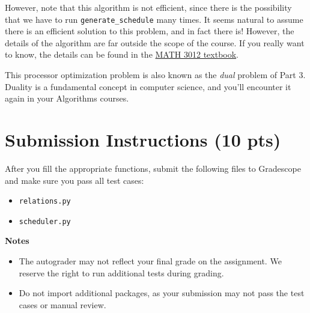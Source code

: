 \documentclass{article}
\begin{document}
    \vspace{3mm}
    However, note that this algorithm is not efficient, since there is the possibility that we have to run \lstinline{generate_schedule} many times. It seems natural to assume there is an efficient solution to this problem, and in fact there is! However, the details of the algorithm are far outside the scope of the course. If you really want to know, the details can be found in the \href{https://www.appliedcombinatorics.org/book/s_flowapplications_chain-partition.html}{MATH 3012 textbook}.
    
    
    \vspace{3mm} This processor optimization problem is also known as the \textit{dual} problem of Part 3. Duality is a fundamental concept in computer science, and you'll encounter it again in your Algorithms courses.



    



\section*{Submission Instructions (10 pts)}
    After you fill the appropriate functions, submit the following files to Gradescope and make sure you pass all test cases:
    \begin{itemize}
        \item \lstinline{relations.py}
        \item \lstinline{scheduler.py}
    \end{itemize}

    \vspace{3mm}
    \textbf{Notes}

    \begin{itemize}
        \item The autograder may not reflect your final grade on the assignment. We reserve the right to run additional tests during grading.
        \item Do not import additional packages, as your submission may not pass the test cases or manual review.
    \end{itemize}

    
\end{document}

